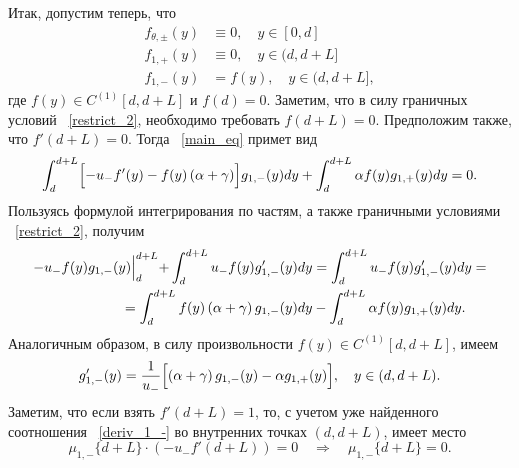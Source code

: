 \documentclass[12pt,a4paper]{article}
\begin{document}
Итак, допустим теперь, что 
\begin{equation*}
    \begin{aligned}
        f_{\theta, \pm} (y) &\equiv 0, \quad y \in [0, d]\\
        f_{1, +} (y) &\equiv 0, \quad y \in (d, d + L]\\
        f_{1, -} (y) &= f (y), \quad y \in (d, d + L],
    \end{aligned}
\end{equation*}
где $f(y) \in C^{(1)} [d, d + L]$ и $f (d) = 0$. Заметим, что в силу граничных условий ~\eqref{restrict_2}, необходимо требовать $f (d + L) = 0$. Предположим также, что $f' (d + L) = 0$. Тогда ~\eqref{main_eq} примет вид
\begin{equation*}
    \begin{aligned}
        \int_d^{d + L} \Bigl[-u_- f' (y) - f(y) \left(\alpha + \gamma \right) \Bigr] g_{1,-} (y) dy + \int_d^{d + L} \alpha f(y) g_{1,+} (y) dy = 0.
    \end{aligned}
\end{equation*}
Пользуясь формулой интегрирования по частям, а также граничными условиями ~\eqref{restrict_2}, получим
\begin{equation*}
    \begin{aligned}
        -u_- f (y) g_{1,-} (y) \Bigl|_d^{d + L} + \int_d^{d + L} u_- f (y) g_{1,-}' (y) dy &= \int_d^{d + L} u_- f (y) g_{1,-}' (y) dy =\\ 
        = \int_d^{d + L} f(y) \left(\alpha + \gamma \right) g_{1,-} (y) dy &- \int_d^{d + L} \alpha f(y) g_{1,+} (y) dy.
    \end{aligned}
\end{equation*}
Аналогичным образом, в силу произвольности $f (y) \in C^{(1)} [d, d + L]$, имеем
\begin{equation}\label{deriv_1_-}
    g_{1,-}' (y) = \frac{1}{u_-} \Bigl[ \left(\alpha + \gamma \right) g_{1,-} (y) - \alpha g_{1,+} (y)\Bigr], \quad y \in (d, d + L).
\end{equation}
Заметим, что если взять $f' (d + L) = 1$, то, с учетом уже найденного соотношения ~\eqref{deriv_1_-} во внутренних точках $(d, d + L)$, имеет место
$$\mu_{1,-} \{ d + L \} \cdot \left( - u_- f' (d + L) \right)  = 0 \quad \Longrightarrow \quad \mu_{1,-} \{ d + L \} = 0.$$
\end{document}
